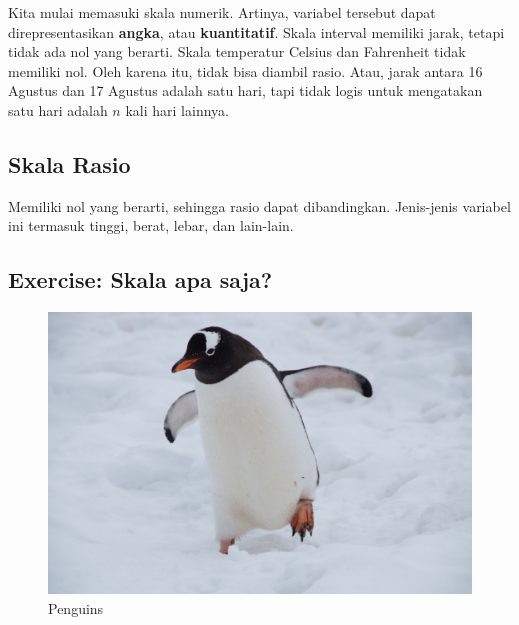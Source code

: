 \documentclass[
  letterpaper,
  DIV=11,
  numbers=noendperiod]{scrreprt}
\begin{document}
Kita mulai memasuki skala numerik. Artinya, variabel tersebut dapat
direpresentasikan \textbf{angka}, atau \textbf{kuantitatif}. Skala
interval memiliki jarak, tetapi tidak ada nol yang berarti. Skala
temperatur Celsius dan Fahrenheit tidak memiliki nol. Oleh karena itu,
tidak bisa diambil rasio. Atau, jarak antara 16 Agustus dan 17 Agustus
adalah satu hari, tapi tidak logis untuk mengatakan satu hari adalah
\(n\) kali hari lainnya.

\hypertarget{skala-rasio}{%
\subsection{Skala Rasio}\label{skala-rasio}}

Memiliki nol yang berarti, sehingga rasio dapat dibandingkan.
Jenis-jenis variabel ini termasuk tinggi, berat, lebar, dan lain-lain.

\hypertarget{exercise-skala-apa-saja}{%
\subsection{Exercise: Skala apa saja?}\label{exercise-skala-apa-saja}}

\begin{figure}

{\centering \includegraphics{./penguins2.jpg}

}

\caption{Penguins}

\end{figure}
\end{document}
